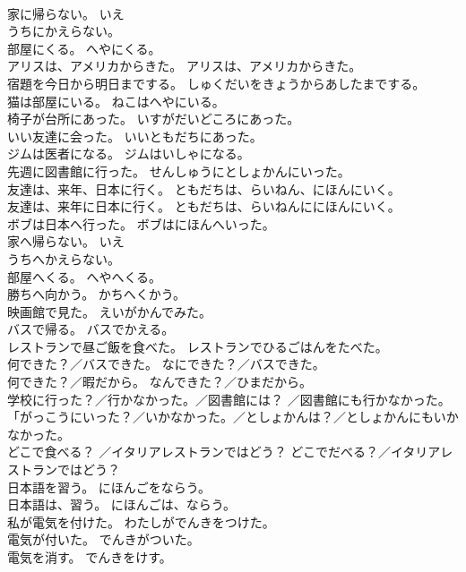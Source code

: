 \documentclass[8pt]{extreport}
\begin{document}
\begin{CJK}{UTF8}{min}
\\	家に帰らない。	{いえ
\\	うち}にかえらない。 
\\	部屋にくる。	へやにくる。 
\\	アリスは、アメリカからきた。	アリスは、アメリカからきた。 
\\	宿題を今日から明日までする。	しゅくだいをきょうからあしたまでする。 
\\	猫は部屋にいる。	ねこはへやにいる。 
\\	椅子が台所にあった。	いすがだいどころにあった。 
\\	いい友達に会った。	いいともだちにあった。 
\\	ジムは医者になる。	ジムはいしゃになる。 
\\	先週に図書館に行った。	せんしゅうにとしょかんにいった。 
\\	友達は、来年、日本に行く。	ともだちは、らいねん、にほんにいく。 
\\	友達は、来年に日本に行く。	ともだちは、らいねんににほんにいく。 
\\	ボブは日本へ行った。	ボブはにほんへいった。 
\\	家へ帰らない。	{いえ
\\	うち}へかえらない。 
\\	部屋へくる。	へやへくる。 
\\	勝ちへ向かう。	かちへくかう。 
\\	映画館で見た。	えいがかんでみた。 
\\	バスで帰る。	バスでかえる。 
\\	レストランで昼ご飯を食べた。	レストランでひるごはんをたべた。 
\\	何できた？／バスできた。	なにできた？／バスできた。 
\\	何できた？／暇だから。	なんできた？／ひまだから。 
\\	学校に行った？／行かなかった。／図書館には？ ／図書館にも行かなかった。	「がっこうにいった？／いかなかった。／としょかんは？／としょかんにもいかなかった。 
\\	どこで食べる？ ／イタリアレストランではどう？	どこでだべる？／イタリアレストランではどう？ 
\\	日本語を習う。	にほんごをならう。 
\\	日本語は、習う。	にほんごは、ならう。 
\\	私が電気を付けた。	わたしがでんきをつけた。 
\\	電気が付いた。	でんきがついた。 
\\	電気を消す。	でんきをけす。 

\end{CJK}
\end{document}
